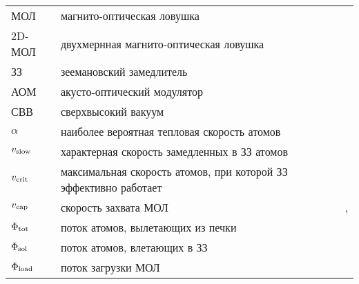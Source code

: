 

 
\begin{tabular}{lll}
	МОЛ & магнито-оптическая ловушка & \pageref{subsec:мол} \\ 
	2D-МОЛ  & двухмернная магнито-оптическая ловушка & \\ 
	ЗЗ & зеемановский замедлитель & \\
	АОМ & акусто-оптический модулятор & \\
	СВВ & сверхвысокий вакуум & \\
	$\alpha$ & наиболее вероятная тепловая скорость атомов & \pageref{Поток атомов на выходе}\\ 
	$v_{\textnormal{slow}}$ &  характерная скорость замедленных в ЗЗ атомов & \pageref{Тормозящая сила} \\
	$v_{\textnormal{crit}}$ & максимальная скорость атомов, при которой ЗЗ эффективно работает  & \pageref{Тормозящая сила} \\
	$v_{\textnormal{cap}}$ & скорость захвата МОЛ & \pageref{Эффективность замедлителя}, \pageref{Поток загрузки} \\
	$\Phi_{\textnormal{tot}}$ & поток атомов, вылетающих из печки & \\
	$\Phi_{\textnormal{sol}}$ & поток атомов, влетающих в ЗЗ & \pageref{Поток атомов на выходе} \\
	$\Phi_{\textnormal{load}}$ & поток загрузки МОЛ & \pageref{Динамика количества атомов в МОЛ} \\
\end{tabular}

